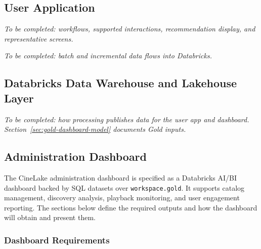 \documentclass[a4paper,12pt]{article}
\begin{document}
\subsection{User Application}

\textit{To be completed: workflows, supported interactions,
recommendation display, and representative screens.}




\textit{To be completed: batch and incremental data flows
into Databricks.}

\subsection{Databricks Data Warehouse and Lakehouse Layer}

\textit{To be completed: how processing publishes data for
the user app and dashboard.
Section~\ref{sec:gold-dashboard-model} documents Gold inputs.}

\subsection{Administration Dashboard}
\label{sec:admin-dashboard}

The CineLake administration dashboard is specified as a Databricks
AI/BI dashboard backed by SQL datasets over \texttt{workspace.gold}.
It supports catalog management, discovery analysis, playback
monitoring, and user engagement reporting. The sections below define
the required outputs and how the dashboard will obtain and present
them.

\subsubsection{Dashboard Requirements}
\end{document}
